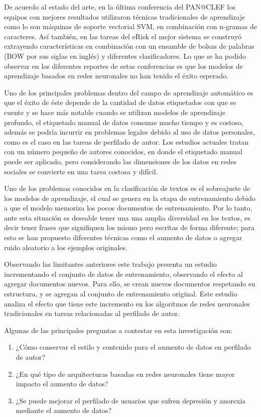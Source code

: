 De acuerdo al estado del arte, en la última conferencia del PAN@CLEF los equipos con mejores resultados utilizaron técnicas tradicionales de aprendizaje como lo son máquinas de soporte vectorial SVM, en combinación con n-gramas de caracteres. Así también, en las tareas del eRisk el mejor sistema se construyó extrayendo características en combinación con un ensamble de bolsas de palabras (BOW por sus siglas en inglés) y diferentes clasificadores. Lo que se ha podido observar en los diferentes reportes de estas conferencias es que los modelos de aprendizaje basados en redes neuronales no han tenido el éxito esperado. 

Uno de los principales problemas dentro del campo de aprendizaje automático es que el éxito de éste depende de la cantidad de datos etiquetados con que se cuente y se hace más notable cuando se utilizan modelos de aprendizaje profundo, el etiquetado manual de datos consume mucho tiempo y es costoso, además se podría incurrir en problemas legales debido al uso de datos personales, como es el caso en las tareas de perfilado de autor. Los estudios actuales tratan con un número pequeño de autores conocidos, en donde el etiquetado manual puede ser aplicado, pero considerando las dimensiones de los datos en redes sociales se convierte en una tarea costosa y difícil.

Uno de los problemas conocidos en la clasificación de textos es el sobreajuste de los modelos de aprendizaje, el cual se genera en la etapa de entrenamiento debido a que el modelo memoriza los pocos documentos de entrenamiento. Por lo tanto, ante esta situación es deseable tener una una amplia diversidad en los textos, es decir tener frases que signifiquen los mismo pero escritas de forma diferente; para esto se han propuesto diferentes técnicas como el aumento de datos o agregar ruido aleatorio a los ejemplos originales.

Observando las limitantes anteriores este trabajo presenta un estudio incrementando el conjunto de datos de entrenamiento, observando el efecto al agregar documentos nuevos. Para ello, se crean nuevos documentos respetando su estructura, y se agregan al conjunto de entrenamiento original. Este estudio analiza el efecto que tiene este incremento en los algoritmos de redes neuronales tradicionales en tareas relacionadas al perfilado de autor. 

Algunas de las principales preguntas a contestar en esta investigación son:

\begin{enumerate}
    \item {¿Cómo conservar el estilo y contenido para el aumento de datos en perfilado de autor?}
    \item ¿En qué tipo de arquitecturas basadas en redes neuronales tiene mayor impacto el aumento de datos?
    \item ¿Se puede mejorar el perfilado de usuarios que sufren depresión y anorexia mediante el aumento de datos?
\end{enumerate}


